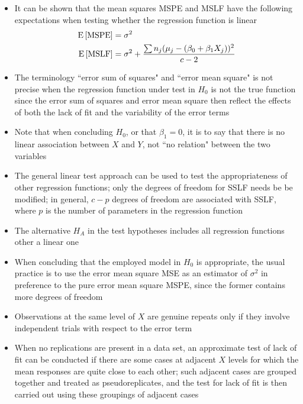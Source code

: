 \begin{itemize}
\item It can be shown that the mean squares MSPE and MSLF have the following expectations when testing whether the regression function is linear $$ \begin{aligned} \mathrm{E}\left[ \text{MSPE} \right] &= \sigma^2 \\ \mathrm{E}\left[ \text{MSLF} \right] &= \sigma^2 + \frac{\sum n_j(\mu_j - (\beta_0 + \beta_1X_j))^2}{c-2} \end{aligned} $$ 
\item The terminology ``error sum of squares" and ``error mean square" is not precise when the regression function under test in $H_0$ is not the true function since the error sum of squares and error mean square then reflect the effects of both the lack of fit and the variability of the error terms 
\item Note that when concluding $H_0$, or that $\beta_1 = 0$, it is to say that there is no linear association between $X$ and $Y$, not ``no relation" between the two variables 
\item The general linear test approach can be used to test the appropriateness of other regression functions; only the degrees of freedom for SSLF needs be be modified; in general, $c-p$ degrees of freedom are associated with SSLF, where $p$ is the number of parameters in the regression function 
\item The alternative $H_A$ in the test hypotheses includes all regression functions other a linear one
\item When concluding that the employed model in $H_0$ is appropriate, the usual practice is to use the error mean square MSE as an estimator of $\sigma^2$ in preference to the pure error mean square MSPE, since the former contains more degrees of freedom
\item Observations at the same level of $X$ are genuine repeats only if they involve independent trials with respect to the error term
\item When no replications are present in a data set, an approximate test of lack of fit can be conducted if there are some cases at adjacent $X$ levels for which the mean responses are quite close to each other; such adjacent cases are grouped together and treated as pseudoreplicates, and the test for lack of fit is then carried out using these groupings of adjacent cases
\end{itemize} 

